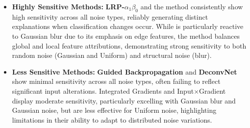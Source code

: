 \begin{itemize}
    \item \textbf{Highly Sensitive Methods:} \textbf{LRP-$\alpha_1\beta_0$} and the \CTC\/ method consistently show high sensitivity across all noise types, reliably generating distinct explanations when classification changes occur. While \LRP\/ is particularly reactive to Gaussian blur due to its emphasis on edge features, the \CTC\/ method balances global and local feature attributions, demonstrating strong sensitivity to both random noise (Gaussian and Uniform) and structural noise (blur).

    \item \textbf{Less Sensitive Methods:} \textbf{Guided Backpropagation} and \textbf{DeconvNet} show minimal sensitivity across all noise types, often failing to reflect significant input alterations. Integrated Gradients and Input$\times$Gradient display moderate sensitivity, particularly excelling with Gaussian blur and Gaussian noise, but are less effective for Uniform noise, highlighting limitations in their ability to adapt to distributed noise variations.
\end{itemize}







